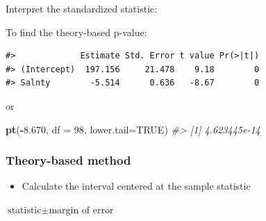 \documentclass[
]{report}
\newenvironment{Shaded}{\begin{snugshade}}{\end{snugshade}}
\newcommand{\AttributeTok}[1]{\textcolor[rgb]{0.13,0.29,0.53}{#1}}
\newcommand{\CommentTok}[1]{\textcolor[rgb]{0.56,0.35,0.01}{\textit{#1}}}
\newcommand{\ConstantTok}[1]{\textcolor[rgb]{0.56,0.35,0.01}{#1}}
\newcommand{\DecValTok}[1]{\textcolor[rgb]{0.00,0.00,0.81}{#1}}
\newcommand{\FloatTok}[1]{\textcolor[rgb]{0.00,0.00,0.81}{#1}}
\newcommand{\FunctionTok}[1]{\textcolor[rgb]{0.13,0.29,0.53}{\textbf{#1}}}
\newcommand{\NormalTok}[1]{#1}
\newcommand{\OtherTok}[1]{\textcolor[rgb]{0.56,0.35,0.01}{#1}}
\newcommand{\SpecialCharTok}[1]{\textcolor[rgb]{0.81,0.36,0.00}{\textbf{#1}}}
\providecommand{\tightlist}{%
  \setlength{\itemsep}{0pt}\setlength{\parskip}{0pt}}
\newcommand{\rgi}{\hspace{24pt}}  %
\begin{document}
Interpret the standardized statistic:

\vspace{0.8in}

To find the theory-based p-value:

\begin{Shaded}
\end{Shaded}

\begin{verbatim}
#>             Estimate Std. Error t value Pr(>|t|)
#> (Intercept)  197.156     21.478    9.18        0
#> Salnty        -5.514      0.636   -8.67        0
\end{verbatim}

or

\begin{Shaded}
\begin{Highlighting}[]
\FunctionTok{pt}\NormalTok{(}\SpecialCharTok{{-}}\FloatTok{8.670}\NormalTok{, }\AttributeTok{df =} \DecValTok{98}\NormalTok{, }\AttributeTok{lower.tail=}\ConstantTok{TRUE}\NormalTok{)}
\CommentTok{\#\textgreater{} [1] 4.623445e{-}14}
\end{Highlighting}
\end{Shaded}

\newpage

\subsubsection*{Theory-based method}\label{theory-based-method-3}

\begin{itemize}
\tightlist
\item
  Calculate the interval centered at the sample statistic
\end{itemize}

\rgi \(\text{statistic} \pm \text{margin of error}\)

\vspace{0.6in}

\begin{Shaded}
\end{Shaded}
\end{document}
